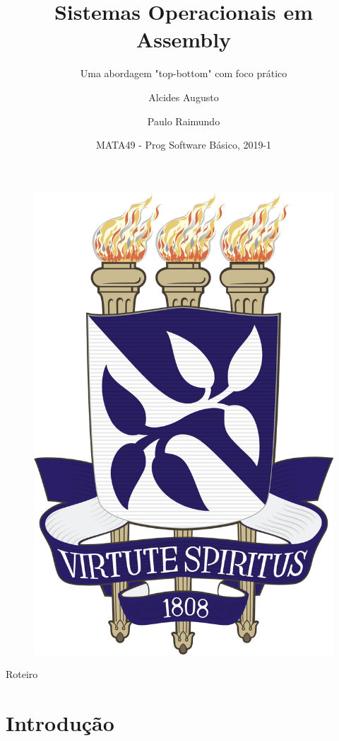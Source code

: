 \documentclass{beamer}
\title{Sistemas Operacionais em Assembly}
\subtitle{Uma abordagem "top-bottom" com foco prático}
\author{
  Alcides Augusto
  \and 
  Paulo Raimundo
}
\institute[Universidade Federal da Bahia] {
  Colegiado de Engenharia da Computação\\
  Universidade Federal da Bahia
}
\date{MATA49 - Prog Software Básico, 2019-1}
\begin{document}
  \begin{frame}
    \titlepage
    \begin{figure}[!htb]
      \centering
      \includegraphics[scale=0.15]{brasao_ufba}
      \label{brasaoUFBA}
    \end{figure}
  \end{frame}

  \begin{frame}{Roteiro}
    \tableofcontents
  \end{frame}

  \section{Introdução}
\end{document}

